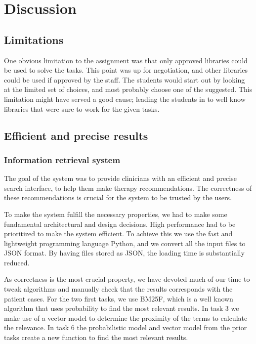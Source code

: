 \chapter{Discussion}
\label{cha:discussion}

\section{Limitations}
One obvious limitation to the assignment was that only approved libraries could be used to solve the tasks. This point was up for negotiation, and other libraries could be used if approved by the staff. The students would start out by looking at the limited set of choices, and most probably choose one of the suggested. This limitation might have served a good cause; leading the students in to well know libraries that were sure to work for the given tasks.

\section{Efficient and precise results}
\subsection{Information retrieval system}
The goal of the system was to provide clinicians with an efficient and precise search interface, to help them make therapy recommendations. The correctness of these recommendations is crucial for the system to be trusted by the users.

To make the system fulfill the necessary properties, we had to make some fundamental architectural and design decisions.
High performance had to be prioritized to make the system efficient. To achieve this we use the fast and lightweight programming language Python, and we convert all the input files to JSON format. By having files stored as JSON, the loading time is substantially reduced.

As correctness is the most crucial property, we have devoted much of our time to tweak algorithms and manually check that the results corresponds with the patient cases. For the two first tasks, we use BM25F, which is a well known algorithm that uses probability to find the most relevant results. In task 3 we make use of a vector model to determine the proximity of the terms to calculate the relevance. In task 6 the probabilistic model and vector model from the prior tasks create a new function to find the most relevant results.    


